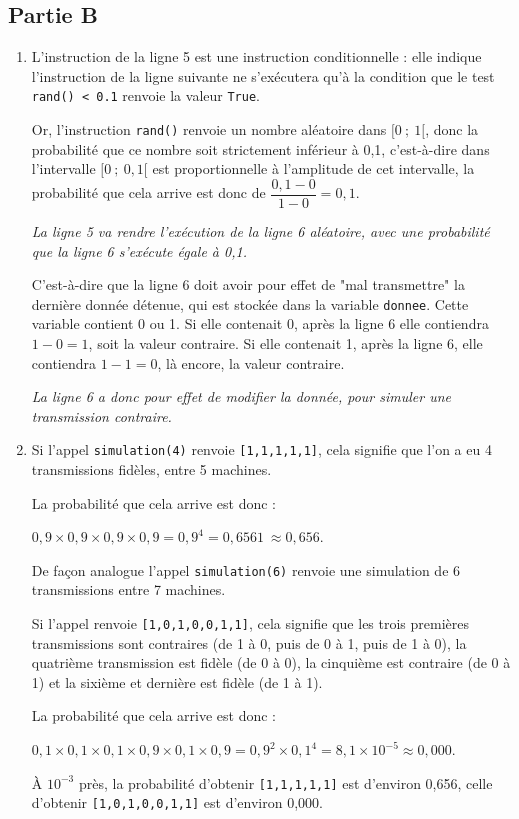 \documentclass[10pt]{article}
\providecommand{\np}[2][]{{#2~#1}}
\begin{document}
\subsection*{Partie B}

\begin{enumerate}
	\item L'instruction de la ligne 5 est une instruction conditionnelle : elle indique l'instruction de la ligne suivante ne s'exécutera qu'à la condition que le test \texttt{rand() < 0.1} renvoie la valeur \texttt{True}.

Or, l'instruction \texttt{rand()} renvoie un nombre aléatoire dans $[0~;~1[$, donc la probabilité que ce nombre soit strictement inférieur à 0,1, c'est-à-dire dans l'intervalle $[0~;~0,1[$ est proportionnelle à l'amplitude de cet intervalle, la probabilité que cela arrive est donc de $\dfrac{0,1 - 0}{1 - 0} = 0,1$.

\emph{La ligne 5 va rendre l'exécution de la ligne 6 aléatoire, avec une probabilité que la ligne 6 s'exécute égale à 0,1.}

C'est-à-dire que la ligne 6 doit avoir pour effet de "mal transmettre" la dernière donnée détenue, qui est stockée dans la variable \texttt{donnee}. Cette variable contient 0 ou 1. Si elle contenait 0, après la ligne 6 elle contiendra $1 - 0 = 1$, soit la valeur contraire. Si elle contenait 1, après la ligne 6, elle contiendra $1 - 1 = 0$, là encore, la valeur contraire.

\emph{La ligne 6 a donc pour effet de modifier la donnée, pour simuler une transmission contraire.}

	\item Si l'appel \texttt{simulation(4)} renvoie \texttt{[1,1,1,1,1]}, cela signifie que l'on a eu 4 transmissions fidèles, entre 5 machines.

La probabilité que cela arrive est donc  :

$0,9 \times 0,9 \times 0,9 \times 0,9 = 0,9^{4} = \np{0,6561}\approx 0,656$.

De façon analogue l'appel \texttt{simulation(6)} renvoie une simulation de 6 transmissions entre 7 machines.

Si l'appel renvoie \texttt{[1,0,1,0,0,1,1]}, cela signifie que les trois premières transmissions sont contraires (de 1 à 0, puis de 0 à 1, puis de 1 à 0), la quatrième transmission est fidèle (de 0 à 0), la cinquième est contraire (de 0 à 1) et la sixième et dernière est fidèle (de 1 à 1).

La probabilité que cela arrive est donc  :

$0,1 \times 0,1 \times 0,1 \times 0,9 \times 0,1 \times 0,9 = 0,9^{2}\times 0,1^{4} = 8,1\times 10^{-5}\approx 0,000$.

À $10^{-3}$ près, la probabilité d'obtenir \texttt{[1,1,1,1,1]} est d'environ 0,656, celle d'obtenir \texttt{[1,0,1,0,0,1,1]} est d'environ 0,000.
\end{enumerate}
\end{document}
